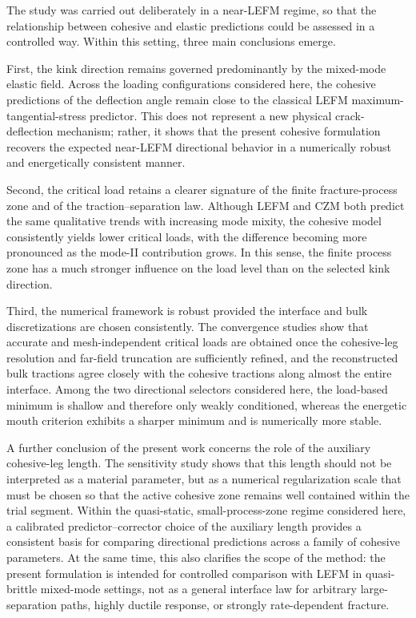 \documentclass[smallextended]{svjour3}       %
\begin{document}
The study was carried out deliberately in a near-LEFM regime, so that the
relationship between cohesive and elastic predictions could be assessed in a
controlled way. Within this setting, three main conclusions emerge.

First, the kink direction remains governed predominantly by the mixed-mode
elastic field. Across the loading configurations considered here, the
cohesive predictions of the deflection angle remain close to the classical
LEFM maximum-tangential-stress predictor. This does not represent a new
physical crack-deflection mechanism; rather, it shows that the present
cohesive formulation recovers the expected near-LEFM directional behavior in
a numerically robust and energetically consistent manner.

Second, the critical load retains a clearer signature of the finite
fracture-process zone and of the traction--separation law. Although LEFM and
CZM both predict the same qualitative trends with increasing mode mixity,
the cohesive model consistently yields lower critical loads, with the
difference becoming more pronounced as the mode-II contribution grows. In
this sense, the finite process zone has a much stronger influence on the
load level than on the selected kink direction.

Third, the numerical framework is robust provided the interface and bulk
discretizations are chosen consistently. The convergence studies show that
accurate and mesh-independent critical loads are obtained once the
cohesive-leg resolution and far-field truncation are sufficiently refined,
and the reconstructed bulk tractions agree closely with the cohesive
tractions along almost the entire interface. Among the two directional
selectors considered here, the load-based minimum is shallow and therefore
only weakly conditioned, whereas the energetic mouth criterion exhibits a
sharper minimum and is numerically more stable.

A further conclusion of the present work concerns the role of the auxiliary
cohesive-leg length. The sensitivity study shows that this length should not
be interpreted as a material parameter, but as a numerical regularization
scale that must be chosen so that the active cohesive zone remains well
contained within the trial segment. Within the quasi-static, small-process-zone
regime considered here, a calibrated predictor--corrector choice of the
auxiliary length provides a consistent basis for comparing directional
predictions across a family of cohesive parameters. At the same time, this
also clarifies the scope of the method: the present formulation is intended
for controlled comparison with LEFM in quasi-brittle mixed-mode settings,
not as a general interface law for arbitrary large-separation paths, highly
ductile response, or strongly rate-dependent fracture.
\end{document}
